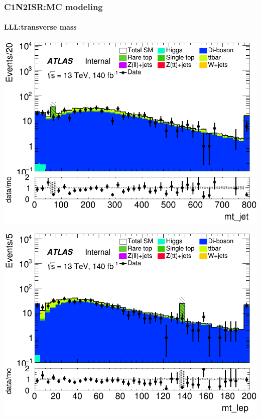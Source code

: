 \documentclass[usenames,dvipsnames]{beamer}
\begin{document}
\begin{frame}
\frametitle{C1N2ISR:MC modeling}
\framesubtitle{LLL:\quad transverse mass}
    \begin{minipage}{0.32\textwidth}
        \centering
        \includegraphics[width=\textwidth]{graphics/LLL_met/LLL_met_mt_jet.png}
    \end{minipage}
    \hfill
    \begin{minipage}{0.32\textwidth}
        \centering
        \includegraphics[width=\textwidth]{graphics/LLL_met/LLL_met_mt_lep.png}
    \end{minipage}
    \hfill
    \begin{minipage}{0.32\textwidth}
        \centering

\end{minipage}
\end{frame}
\end{document}
